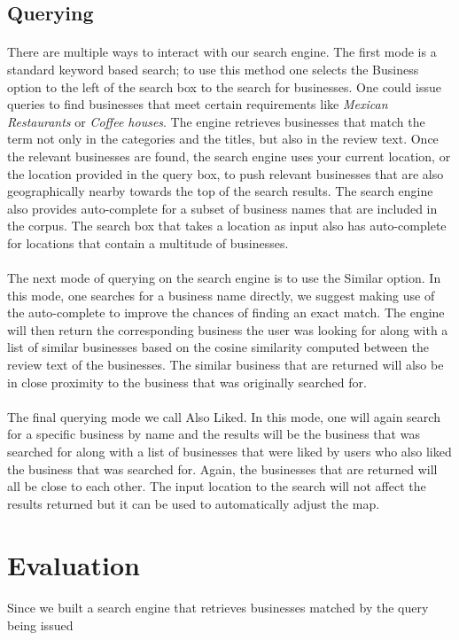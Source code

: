 \documentclass[paper=letter, fontsize=15pt]{article} %
\begin{document}
\subsection{Querying}
\paragraph{}There are multiple ways to interact with our search engine. The first mode is a standard keyword based search; to use this method one selects the Business option to the left of the search box to the search for businesses. One could issue queries to find businesses that meet certain requirements like \textit{Mexican Restaurants} or \textit{Coffee houses}. The engine retrieves businesses that match the term not only in the categories and the titles, but also in the review text. Once the relevant businesses are found, the search engine uses your current location, or the location provided in the query box, to push relevant businesses that are also geographically nearby towards the top of the search results. The search engine also provides auto-complete for a subset of business names that are included in the corpus. The search box that takes a location as input also has auto-complete for locations that contain a multitude of businesses. 

\paragraph{}The next mode of querying on the search engine is to use the Similar option. In this mode, one searches for a business name directly, we suggest making use of the auto-complete to improve the chances of finding an exact match. The engine will then return the corresponding business the user was looking for along with a list of similar businesses based on the cosine similarity computed between the review text of the businesses. The similar business that are returned will also be in close proximity to the business that was originally searched for.

\paragraph{}The final querying mode we call Also Liked. In this mode, one will again search for a specific business by name and the results will be the business that was searched for along with a list of businesses that were liked by users who also liked the business that was searched for. Again, the businesses that are returned will all be close to each other. The input location to the search will not affect the results returned but it can be used to automatically adjust the map.

\section{Evaluation}
\paragraph{}Since we built a search engine that retrieves businesses matched by the query being issued



      

\end{document}
